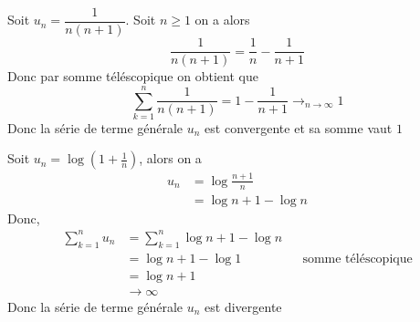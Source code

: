 \documentclass[11pt,colorlinks]{book}
\theoremstyle{mytheoremstyle}
\theoremstyle{mytheoremstyle}
\theoremstyle{mytheoremstyle}
\theoremstyle{mytheoremstyle}
\theoremstyle{mytheoremstyle}
\theoremstyle{mytheoremstyle}
\theoremstyle{mytheoremstyle}
\theoremstyle{mytheoremstyle}
\theoremstyle{myproblemstyle}
\begin{document}
\begin{ex}
  Soit $u_n = \dfrac{1}{n(n+1)}$. Soit $n \geq 1$ on a alors
  \begin{equation*}
    \dfrac{1}{n(n+1)} = \dfrac{1}{n} - \dfrac{1}{n+1}
  \end{equation*}
  Donc par somme téléscopique on obtient que 
  \begin{equation*}
    \sum_{k=1}^{n} \dfrac{1}{n(n+1)} = 1 - \dfrac{1}{n+1} \to_{n \to \infty} 1 
  \end{equation*}
  Donc la série de terme générale $u_n$ est convergente et sa somme vaut $1$
\end{ex}
\begin{ex}
  Soit $u_n = \log \left(1 + \frac{1}{n}\right)$, alors on a 
  \begin{align*}
    u_n &= \log \frac{n+1}{n} \\ 
        &= \log n+1 - \log n
  \end{align*}
  Donc,
  \begin{align*}
    \sum_{k=1}^{n} u_n &= \sum_{k=1}^n \log n+1 - \log n \\
                       &= \log n+1 - \log 1 && \text{somme téléscopique} \\ 
                       &= \log n+1 \\
                       &\to \infty
  \end{align*}
  Donc la série de terme générale $u_n$ est divergente
\end{ex}
\end{document}
